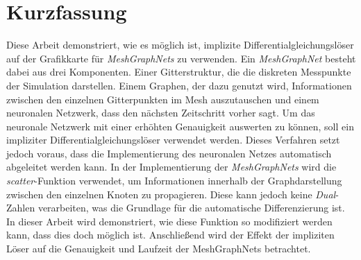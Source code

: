 \chapter*{Kurzfassung}

Diese Arbeit demonstriert, wie es möglich ist, implizite Differentialgleichungslöser 
auf der Grafikkarte für \textit{MeshGraphNets} zu verwenden.
Ein \textit{MeshGraphNet} besteht dabei aus drei Komponenten.
Einer Gitterstruktur, die die diskreten Messpunkte der Simulation darstellen.
Einem Graphen, der dazu genutzt wird, Informationen zwischen den einzelnen Gitterpunkten im Mesh auszutauschen
und einem neuronalen Netzwerk, dass den nächsten Zeitschritt vorher sagt.
Um das neuronale Netzwerk mit einer erhöhten Genauigkeit auswerten zu können, soll ein impliziter Differentialgleichungslöser verwendet werden.
Dieses Verfahren setzt jedoch voraus, dass die Implementierung des neuronalen
Netzes automatisch abgeleitet werden kann.
In der Implementierung der \textit{MeshGraphNets} wird die \textit{scatter}-Funktion verwendet, um Informationen
innerhalb der Graphdarstellung zwischen den einzelnen Knoten zu propagieren.
Diese kann jedoch keine \textit{Dual}-Zahlen verarbeiten, was die Grundlage für die automatische Differenzierung ist.
In dieser Arbeit wird demonstriert, wie diese Funktion so modifiziert werden kann, dass dies doch möglich ist.
Anschließend wird der Effekt der impliziten Löser auf die Genauigkeit und Laufzeit der MeshGraphNets betrachtet.

\cleardoublepage